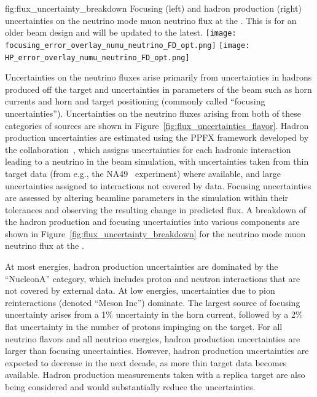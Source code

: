 

\begin{dunefigure}{fig:flux_uncertainty_breakdown}
{Focusing (left) and hadron production (right) uncertainties on the neutrino mode muon neutrino flux at the .  This is for an older beam design and will be updated to the latest.  }
\texttt{[image: focusing\_error\_overlay\_numu\_neutrino\_FD\_opt.png]}
    \texttt{[image: HP\_error\_overlay\_numu\_neutrino\_FD\_opt.png]}\end{dunefigure}

Uncertainties on the neutrino fluxes arise primarily from uncertainties in hadrons produced off the target and uncertainties in parameters of the beam such as horn currents and horn and target positioning (commonly called ``focusing uncertainties'').  Uncertainties on the neutrino fluxes arising from both of these categories of sources are shown in Figure~\ref{fig:flux_uncertainties_flavor}.  Hadron production uncertainties are estimated using the PPFX framework developed by the \minerva collaboration~\cite{Aliaga:2016oaz, AliagaSoplin:2016shs}, which assigns uncertainties for each hadronic interaction leading to a neutrino in the beam simulation, with uncertainties taken from thin target data (from e.g., the NA49~\cite{NA49} experiment) where available, and large uncertainties assigned to interactions not covered by data.  Focusing uncertainties are assessed by altering beamline parameters in the simulation within their tolerances and observing the resulting change in predicted flux.  A breakdown of the hadron production and focusing uncertainties into various components are shown in Figure~\ref{fig:flux_uncertainty_breakdown} for the neutrino mode muon neutrino flux at the .    

At most energies, hadron production uncertainties are dominated by the ``NucleonA'' category, which includes proton and neutron interactions that are not covered by external data.  At low energies, uncertainties due to pion reinteractions (denoted ``Meson Inc'') dominate.   The largest source of focusing uncertainty arises from a 1\% uncertainty in the horn current, followed by a 2\% flat uncertainty in the number of protons impinging on the target.   For all neutrino flavors and all neutrino energies, hadron production uncertainties are larger than focusing uncertainties.  However, hadron production uncertainties are expected to decrease in the next decade, as more thin target data becomes available.  Hadron production measurements taken with a replica target are also being considered and would substantially reduce the uncertainties.  


